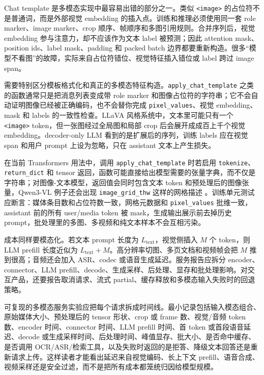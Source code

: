 \documentclass[UTF8,zihao=-4,openany]{ctexbook}
\begin{document}
Chat template 是多模态实现中最容易出错的部分之一。类似 \texttt{<image>} 的占位符不是普通词，而是外部视觉 embedding 的插入点。训练和推理必须使用同一套 role marker、image marker、crop 顺序、帧顺序和多图引用规则。合并序列后，视觉 embedding 参与注意力，却不应该作为文本 label 被预测；因此 attention mask、position ids、label mask、padding 和 packed batch 边界都要重新构造。很多“模型不看图”的故障，实际来自占位符错位、视觉特征插入错位或 label 跨过 image span。

需要特别区分模板格式化和真正的多模态特征构造。\texttt{apply\_chat\_template} 之类的函数通常只是把消息列表变成带 role marker 和图像占位符的字符串；它不会自动证明图像已经被正确编码，也不会替你完成 \texttt{pixel\_values}、视觉 embedding、mask 和 labels 的一致性检查。LLaVA 风格系统中，文本里可能只有一个 \texttt{<image>} token，但一张图经过全局图和局部 crop 后会展开成成百上千个视觉 embedding。decoder-only LLM 看到的是扩展后的序列，训练 labels 应在视觉 span 和用户 prompt 上设为忽略，只在 assistant 文本上产生损失。

在当前 Transformers 用法中，调用 \texttt{apply\_chat\_template} 时若启用 \texttt{tokenize}、\texttt{return\_dict} 和 tensor 返回，函数可能直接给出模型需要的张量字典，而不仅是字符串；对图像-文本模型，返回值会同时包含文本 token 和预处理后的图像张量，Qwen3-VL 例子还会出现 \texttt{image\_grid\_thw} 这样的网格描述 \cite{huggingface2026transformersmultimodalchat,huggingface2026transformersqwen3vl}。训练单元测试应断言：媒体条目数和占位符数一致，网格元数据和 \texttt{pixel\_values} 批维一致，assistant 前的所有 user/media token 被 mask，生成输出展示前去掉历史 prompt，批处理里的多图、多视频和纯文本样本不会互相污染。

成本同样要模态化。若文本 prompt 长度为 $L_{\mathrm{text}}$，视觉侧插入 $M$ 个 token，则 LLM prefill 长度近似为 $L_{\mathrm{text}}+M$。高分辨率切图、多页文档和视频帧会把 $M$ 推到很高；音频还会加入 ASR、codec 或语音生成延迟。服务报告应拆分 encoder、connector、LLM prefill、decode、生成采样、后处理、显存和批处理影响。对交互产品，还要报告取消请求、流式 partial、缓存释放和多模态输入失败时的回退策略。

可复现的多模态服务实验应把每个请求拆成时间线。最小记录包括输入模态组合、原始媒体大小、预处理后的 tensor 形状、crop 或 frame 数、视觉/音频 token 数、encoder 时间、connector 时间、LLM prefill 时间、首 token 或首段语音延迟、decode 或生成采样时间、后处理时间、峰值显存、批大小、是否命中缓存、是否调用 OCR/ASR/检索工具，以及失败时返回的是拒答、降级文本回答还是重新请求上传。这样读者才能看出延迟来自视觉编码、长上下文 prefill、语音合成、视频采样还是安全过滤，而不是把所有成本都笼统归因给模型规模。
\end{document}
